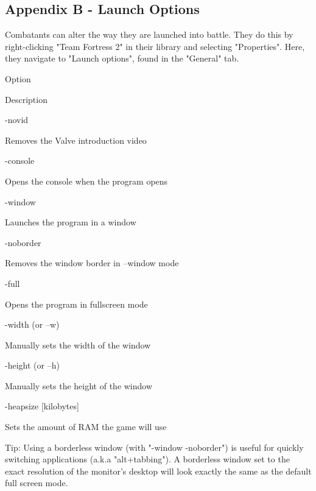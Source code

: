 \subsection{Appendix B - Launch Options}
Combatants can alter the way they are launched into battle. They do this by right-clicking "Team Fortress 2" in their library and selecting "Properties". Here, they navigate to "Launch options", found in the "General" tab.
       
Option
        
Description
            
-novid
        
Removes the Valve introduction video
            
-console
        
Opens the console when the program opens
            
-window
        
Launches the program in a window
            
-noborder
        
Removes the window border in –window mode
            
-full
        
Opens the program in fullscreen mode
            
-width (or –w)
        
Manually sets the width of the window
            
-height (or –h)
        
Manually sets the height of the window
            
-heapsize [kilobytes]
        
Sets the amount of RAM the game will use
 
Tip: Using a borderless window (with "-window -noborder") is useful for quickly switching applications (a.k.a "alt+tabbing").  A borderless window set to the exact resolution of the monitor's desktop will look exactly the same as the default full screen mode.